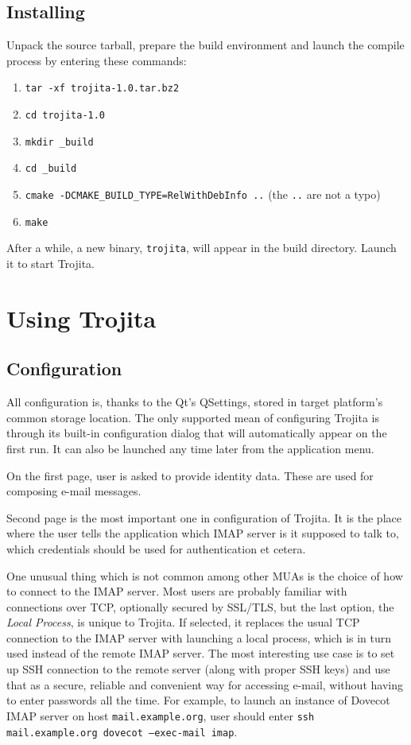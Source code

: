 \documentclass[12pt,notitlepage]{report}
\newcommand{\trojita}{Trojita\xspace}
\begin{document}
\subsection{Installing}

Unpack the source tarball, prepare the build environment and launch the compile
process by entering these commands:

\begin{enumerate}
    \item{{\tt tar -xf trojita-1.0.tar.bz2}}
    \item{{\tt cd trojita-1.0}}
    \item{{\tt mkdir \_build}}
    \item{{\tt cd \_build}}
    \item{{\tt cmake -DCMAKE\_BUILD\_TYPE=RelWithDebInfo ..}} (the {\tt ..} are
        not a typo)
    \item{{\tt make}}
\end{enumerate}

After a while, a new binary, {\tt trojita}, will appear in the build directory.
Launch it to start \trojita.

\section{Using \trojita}
\subsection{Configuration}

All configuration is, thanks to the Qt's QSettings, stored in target platform's
common storage location. The only supported mean of configuring \trojita is
through its built-in configuration dialog that will automatically appear on the
first run.  It can also be launched any time later from the application menu.


On the first page, user is asked to provide identity data. These are used for
composing e-mail messages.

Second page is the most important one in configuration of \trojita. It is the
place where the user tells the application which IMAP server is it supposed to
talk to, which credentials should be used for authentication et cetera.

One unusual thing which is not common among other MUAs is the choice of how to
connect to the IMAP server.  Most users are probably familiar with connections
over TCP, optionally secured by SSL/TLS, but the last option, the {\em Local
Process}, is unique to \trojita. If selected, it replaces the usual TCP
connection to the IMAP server with launching a local process, which is in turn
used instead of the remote IMAP server. The most interesting use case is to set
up SSH connection to the remote server (along with proper SSH keys) and use that
as a secure, reliable and convenient way for accessing e-mail, without having to
enter passwords all the time. For example, to launch an instance of Dovecot IMAP
server on host {\tt mail.example.org}, user should enter {\tt ssh
mail.example.org dovecot --exec-mail imap}.
\end{document}
